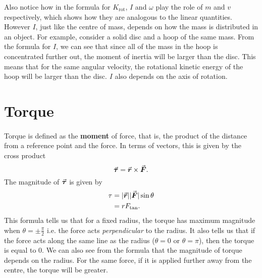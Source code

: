 \documentclass[../newtonian_mechanics.tex]{subfiles}
\begin{document}
        Also notice how in the formula for $K_\text{rot}$, $I$ and $\omega$ play the role of $m$ and $v$ respectively, which shows how they are analogous to the linear quantities.
        However $I$, just like the centre of mass, depends on how the mass is distributed in an object.
        For example, consider a solid disc and a hoop of the same mass.
        From the formula for $I$, we can see that since all of the mass in the hoop is concentrated further out, the moment of inertia will be larger than the disc.
        This means that for the same angular velocity, the rotational kinetic energy of the hoop will be larger than the disc.
        $I$ also depends on the axis of rotation.

    \section{Torque}
        \paragraph{}
        Torque is defined as the \textbf{moment} of force, that is, the product of the distance from a reference point and the force.
        In terms of vectors, this is given by the cross product
        \begin{equation}
            \vec{\boldsymbol\tau}=\vec{\boldsymbol r}\times\vec{\boldsymbol F}.
        \end{equation}
        The magnitude of $\vec{\boldsymbol\tau}$ is given by
        \begin{align}
            \tau&=\lvert\vec{\boldsymbol r}\rvert\lvert\vec{\boldsymbol F}\rvert\sin\theta\\
            &=rF_\text{tan}.
        \end{align}
        This formula tells us that for a fixed radius, the torque has maximum magnitude when $\theta=\pm\frac{\pi}{2}$ i.e. the force acts \textit{perpendicular} to the radius.
        It also tells us that if the force acts along the same line as the radius ($\theta=0$ or $\theta=\pi$), then the torque is equal to 0.
        We can also see from the formula that the magnitude of torque depends on the radius.
        For the same force, if it is applied further away from the centre, the torque will be greater.
    
\end{document}
